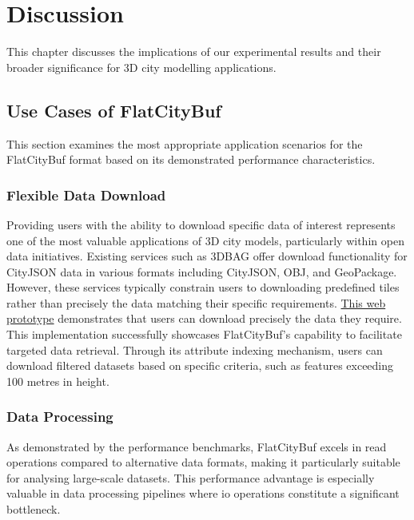 \chapter{Discussion}
\label{chp:discussion}

This chapter discusses the implications of our experimental results and their broader significance for 3D city modelling applications.

\section{Use Cases of FlatCityBuf}
\label{use_case_flat_city_buffer}

This section examines the most appropriate application scenarios for the FlatCityBuf format based on its demonstrated performance characteristics.

\subsection{Flexible Data Download}
\label{flexible_data_download}

Providing users with the ability to download specific data of interest represents one of the most valuable applications of 3D city models, particularly within open data initiatives. Existing services such as 3DBAG offer download functionality for CityJSON data in various formats including CityJSON, OBJ, and GeoPackage. However, these services typically constrain users to downloading predefined tiles rather than precisely the data matching their specific requirements.
\href{https://fcb-web-prototype.netlify.app}{This web prototype} demonstrates that users can download precisely the data they require. This implementation successfully showcases FlatCityBuf's capability to facilitate targeted data retrieval. Through its attribute indexing mechanism, users can download filtered datasets based on specific criteria, such as features exceeding 100 metres in height.

\subsection{Data Processing}
\label{data_processing}

As demonstrated by the performance benchmarks, FlatCityBuf excels in read operations compared to alternative data formats, making it particularly suitable for analysing large-scale datasets. This performance advantage is especially valuable in data processing pipelines where \ac{io} operations constitute a significant bottleneck.

